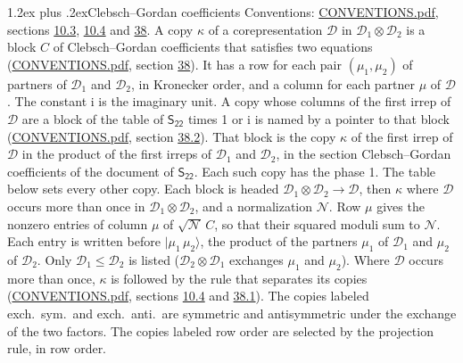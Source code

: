 \documentclass[10pt,a4paper]{article}
\makeatletter
\renewcommand\section{\@startsection{section}{1}{\z@}{-3ex plus -1ex minus -.2ex}%
  {1.2ex plus .2ex}{\normalfont\large\sffamily\bfseries\color{parttitle}}}
\numberwithin{equation}{section}
\newcommand{\grp}[1]{\mathsf{#1}}
\newcommand{\iunit}{\mathrm{i}}
\newcommand{\irrprod}{\otimes}
\newcommand{\mult}{\kappa}
\newcommand{\intx}{\mu}
\newcommand{\cgnorm}{\mathcal{N}}
\newcommand{\prodket}[2]{\lvert {#1}\,{#2}\rangle}
\makeatother
\begin{document}
\section{Clebsch--Gordan coefficients}\label{s:clebsch_gordan}
Conventions: \href{../../CONVENTIONS.pdf}{CONVENTIONS.pdf}, sections \href{../../../rotation/CONVENTIONS.pdf\#conv.10.3}{10.3}, \href{../../../rotation/CONVENTIONS.pdf\#conv.10.4}{10.4} and \href{../../CONVENTIONS.pdf\#conv.38}{38}.
\leavevmode\label{n:index.copy}\label{n:matrix.cg.stored}A copy $\mult$ of a corepresentation $\mathcal{D}$ in $\mathcal{D}_1\irrprod\mathcal{D}_2$ is a block $C$ of Clebsch--Gordan coefficients that satisfies two equations (\href{../../CONVENTIONS.pdf}{CONVENTIONS.pdf}, section \href{../../CONVENTIONS.pdf\#conv.38}{38}). \label{n:index.cg}It has a row for each pair $(\intx_1, \intx_2)$ of partners of $\mathcal{D}_1$ and $\mathcal{D}_2$, in Kronecker order, and a column for each partner $\intx$ of $\mathcal{D}$.
The constant $\iunit$ is the imaginary unit.
A copy whose columns of the first irrep of $\mathcal{D}$ are a block of the table of $\grp{S_{22}}$ times 1 or $\iunit$ is named by a pointer to that block (\href{../../CONVENTIONS.pdf}{CONVENTIONS.pdf}, section \href{../../CONVENTIONS.pdf\#conv.38.2}{38.2}). That block is the copy $\mult$ of the first irrep of $\mathcal{D}$ in the product of the first irreps of $\mathcal{D}_1$ and $\mathcal{D}_2$, in the section Clebsch--Gordan coefficients of the document of \href{../../../rotation/data/pdf/S22.pdf}{$\grp{S_{22}}$}. Each such copy has the phase 1. The table below sets every other copy.
Each block is headed $\mathcal{D}_1\irrprod\mathcal{D}_2\to\mathcal{D}$, then $\mult$ where $\mathcal{D}$ occurs more than once in $\mathcal{D}_1\irrprod\mathcal{D}_2$, and a normalization $\cgnorm$. Row $\intx$ gives the nonzero entries of column $\intx$ of $\sqrt{\cgnorm}\,C$, so that their squared moduli sum to $\cgnorm$. \label{n:vector.ket.product}Each entry is written before $\prodket{\intx_1}{\intx_2}$, the product of the partners $\intx_1$ of $\mathcal{D}_1$ and $\intx_2$ of $\mathcal{D}_2$. Only $\mathcal{D}_1 \le \mathcal{D}_2$ is listed ($\mathcal{D}_2\irrprod\mathcal{D}_1$ exchanges $\intx_1$ and $\intx_2$).
Where $\mathcal{D}$ occurs more than once, $\mult$ is followed by the rule that separates its copies (\href{../../CONVENTIONS.pdf}{CONVENTIONS.pdf}, sections \href{../../../rotation/CONVENTIONS.pdf\#conv.10.4}{10.4} and \href{../../CONVENTIONS.pdf\#conv.38.1}{38.1}). \label{n:abbreviation.exchange}The copies labeled exch.\ sym.\ and exch.\ anti.\ are symmetric and antisymmetric under the exchange of the two factors. The copies labeled row order are selected by the projection rule, in row order.
\end{document}
